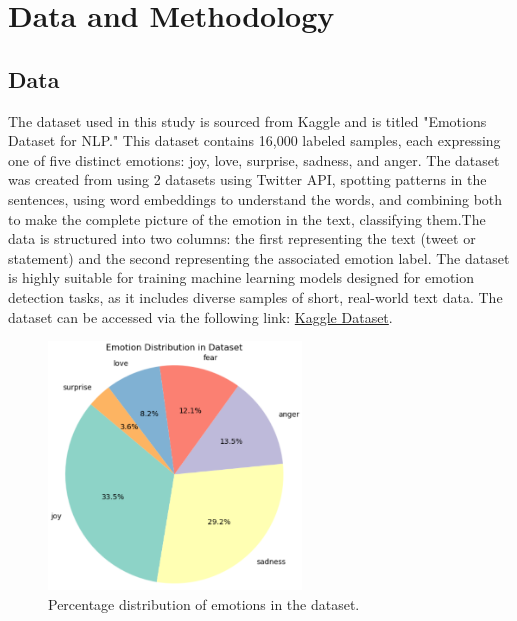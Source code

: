 

\section{Data and Methodology}

\subsection{Data}
The dataset used in this study is sourced from Kaggle and is titled "Emotions Dataset for NLP." This dataset contains 16,000 labeled samples, each expressing one of five distinct emotions: joy, love, surprise, sadness, and anger. The dataset was created from using 2 datasets using Twitter API, spotting patterns in the sentences, using word embeddings to understand the words, and combining both to make the complete picture of the emotion in the text, classifying them.The data is structured into two columns: the first representing the text (tweet or statement) and the second representing the associated emotion label. The dataset is highly suitable for training machine learning models designed for emotion detection tasks, as it includes diverse samples of short, real-world text data. The dataset can be accessed via the following link: \href{https://www.kaggle.com/datasets/praveengovi/emotions-dataset-for-nlp/data}{\color{blue}Kaggle Dataset}.

\begin{figure}[H]
    \centering
    \includegraphics[width=0.6\textwidth]{images/emotion_pie.png}
    \caption{Percentage distribution of emotions in the dataset.}
    \label{fig:emotion_pie}
\end{figure}

